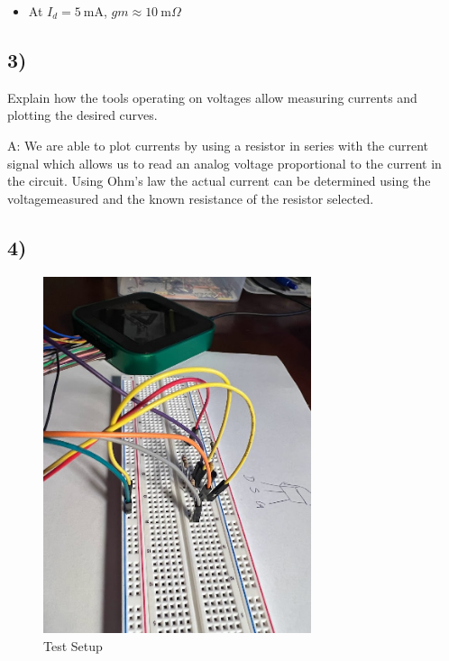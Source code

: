 \documentclass{article}
\begin{document}
	\begin{itemize}
		\item At $I_d = \SI{5}{\mA}$, $gm \approx \SI{10}{\milli\Omega}$
	\end{itemize}
	
	
	\subsection*{3)}
	
	Explain how the tools operating on voltages allow measuring currents and plotting the desired curves.
	
	
	A: We are able to plot currents by using a resistor in series with the current signal which allows us to read an analog voltage proportional to the current in the circuit. Using Ohm's law the actual current can be determined using the voltagemeasured and the known resistance of the resistor selected.
	
	\subsection*{4)}
	
	\begin{figure}[H]
	    \centering
	    \includegraphics[width=0.7\textwidth]{4-photo}
	    \caption{Test Setup}
	\end{figure}
	
\end{document}
